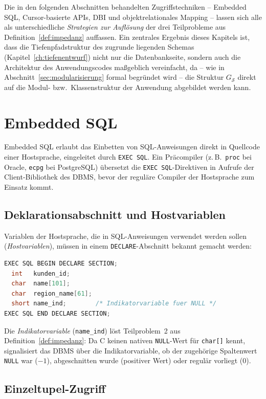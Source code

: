 ﻿\documentclass[a4paper,12pt]{report}
\theoremstyle{definition}
\theoremstyle{remark}
\begin{document}
Die in den folgenden Abschnitten behandelten Zugriffstechniken --
Embedded SQL, Cursor-basierte APIs, DBI und objektrelationales Mapping
-- lassen sich alle als unterschiedliche \emph{Strategien zur
Auflösung} der drei Teilprobleme aus Definition~\ref{def:impedanz}
auffassen. Ein zentrales Ergebnis dieses Kapitels ist, dass die
Tiefenpfadstruktur des zugrunde liegenden Schemas (Kapitel~\ref{ch:tiefenentwurf})
nicht nur die Datenbankseite, sondern auch die Architektur des
Anwendungscodes maßgeblich vereinfacht, da -- wie in
Abschnitt~\ref{sec:modularisierung} formal begründet wird -- die
Struktur $G_{\mathcal{S}}$ direkt auf die Modul- bzw.\
Klassenstruktur der Anwendung abgebildet werden kann.

\section{Embedded SQL}
\label{sec:embedded-sql}

Embedded SQL erlaubt das Einbetten von SQL-Anweisungen direkt in
Quellcode einer Hostsprache, eingeleitet durch \texttt{EXEC SQL}. Ein
Präcompiler (z.\,B.\ \texttt{proc} bei Oracle, \texttt{ecpg} bei
PostgreSQL) übersetzt die \texttt{EXEC SQL}-Direktiven in Aufrufe der
Client-Bibliothek des DBMS, bevor der reguläre Compiler der Hostsprache
zum Einsatz kommt.

\subsection{Deklarationsabschnitt und Hostvariablen}

Variablen der Hostsprache, die in SQL-Anweisungen verwendet werden
sollen (\emph{Hostvariablen}), müssen in einem
\texttt{DECLARE}-Abschnitt bekannt gemacht werden:

\begin{lstlisting}[language=C]
EXEC SQL BEGIN DECLARE SECTION;
  int   kunden_id;
  char  name[101];
  char  region_name[61];
  short name_ind;        /* Indikatorvariable fuer NULL */
EXEC SQL END DECLARE SECTION;
\end{lstlisting}

Die \emph{Indikatorvariable} (\texttt{name\_ind}) löst Teilproblem~2
aus Definition~\ref{def:impedanz}: Da C keinen nativen
\texttt{NULL}-Wert für \texttt{char[]} kennt, signalisiert das DBMS
über die Indikatorvariable, ob der zugehörige Spaltenwert
\texttt{NULL} war ($-1$), abgeschnitten wurde (positiver Wert) oder
regulär vorliegt ($0$).

\subsection{Einzeltupel-Zugriff}
\end{document}
